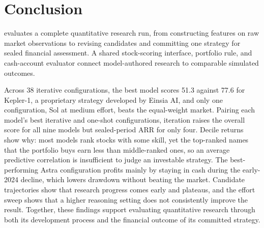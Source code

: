\section{Conclusion}

\BenchmarkName{} evaluates a complete quantitative research run, from constructing features on raw market observations to revising candidates and committing one strategy for sealed financial assessment. A shared stock-scoring interface, portfolio rule, and cash-account evaluator connect model-authored research to comparable simulated outcomes.

Across 38 iterative configurations, the best model scores 51.3 against 77.6 for Kepler-1, a proprietary strategy developed by Einsia AI, and only one configuration, Sol at medium effort, beats the equal-weight market. Pairing each model's best iterative and one-shot configurations, iteration raises the overall score for all nine models but sealed-period ARR for only four. Decile returns show why: most models rank stocks with some skill, yet the top-ranked names that the portfolio buys earn less than middle-ranked ones, so an average predictive correlation is insufficient to judge an investable strategy. The best-performing Astra configuration profits mainly by staying in cash during the early-2024 decline, which lowers drawdown without beating the market. Candidate trajectories show that research progress comes early and plateaus, and the effort sweep shows that a higher reasoning setting does not consistently improve the result. Together, these findings support evaluating quantitative research through both its development process and the financial outcome of its committed strategy.
